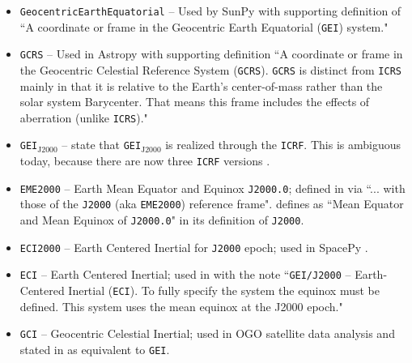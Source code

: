 \documentclass[draft]{agujournal2019}
\begin{document}
\begin{itemize}
    \item \texttt{GeocentricEarthEquatorial} -- Used by SunPy \cite{SunPy} with supporting definition of ``A coordinate or frame in the Geocentric Earth Equatorial (\texttt{GEI}) system."
    
    \item \texttt{GCRS} --  Used in Astropy \cite{AstroPy2022} with supporting definition ``A coordinate or frame in the Geocentric Celestial Reference System (\texttt{GCRS}). \texttt{GCRS} is distinct from \texttt{ICRS} mainly in that it is relative to the Earth’s center-of-mass rather than the solar system Barycenter. That means this frame includes the effects of aberration (unlike \texttt{ICRS})."

    \item \texttt{GEI}$_\mathrm{J2000}$ --  state that \texttt{GEI}$_\mathrm{J2000}$ is realized through the \texttt{ICRF}. This is ambiguous today, because there are now three \texttt{ICRF} versions \cite{Charlot2020}.

    \item \texttt{EME2000} -- Earth Mean Equator and Equinox \texttt{J2000.0}; defined in  via ``... with those of the \texttt{J2000} (aka \texttt{EME2000}) reference frame".  defines as ``Mean Equator and Mean Equinox of \texttt{J2000.0}" in its definition of \texttt{J2000}.

    \item \texttt{ECI2000} -- Earth Centered Inertial for \texttt{J2000} epoch; used in SpacePy \cite{Niehof2022}.

    \item \texttt{ECI} -- Earth Centered Inertial; used in  with the note ``\texttt{GEI/J2000} – Earth-Centered Inertial (\texttt{ECI}). To fully specify the system the equinox must be defined. This system uses the mean equinox at the J2000 epoch."
    
    
   \item \texttt{GCI} -- Geocentric Celestial Inertial; used in OGO satellite data analysis \cite{NASA1970} and stated in  as equivalent to \texttt{GEI}.



\end{itemize}
\end{document}
